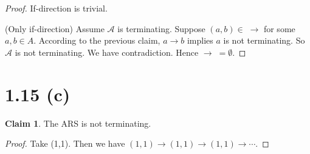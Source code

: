 \documentclass[autodetect-enginem]{article}
\theoremstyle{plain}
\theoremstyle{definition}
\newtheorem*{claim*}{Claim}
\begin{document}
\begin{proof}
    If-direction is trivial.

    (Only if-direction)
    Assume $\mathcal{A}$ is terminating.
    Suppose $(a,b) \in \;\to$ for some $a,b \in A$.
    According to the previous claim, $a \to b$ implies $a$ is not terminating.
    So $\mathcal{A}$ is not terminating. We have contradiction.
    Hence $\to\; = \emptyset$.
    

\end{proof}

\section*{1.15 (c)}

\begin{claim*}
    The ARS is not terminating.
\end{claim*}

\begin{proof}
    Take (1,1).
    Then we have $(1,1) \to (1,1) \to (1,1) \to \cdots$.
\end{proof}
\end{document}
